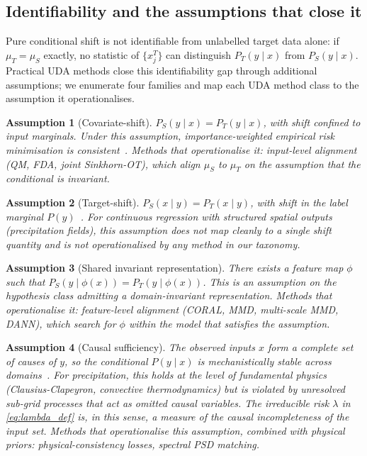 \documentclass{article}
\newtheorem{assumption}{Assumption}
\begin{document}
\subsection{Identifiability and the assumptions that close it}
\label{sec:identifiability}

Pure conditional shift is not identifiable from unlabelled target data
alone: if $\mu_T = \mu_S$ exactly, no statistic of $\{x_j^T\}$ can
distinguish $P_T(y\mid x)$ from $P_S(y\mid x)$. Practical UDA methods
close this identifiability gap through additional assumptions; we
enumerate four families and map each UDA method class to the
assumption it operationalises.

\begin{assumption}[Covariate-shift]
\label{ass:cov}
$P_S(y\mid x) = P_T(y\mid x)$, with shift confined to input marginals.
Under this assumption, importance-weighted empirical risk minimisation
is consistent~\citep{sugiyama2007direct}. Methods that operationalise
it: input-level alignment (QM, FDA, joint Sinkhorn-OT), which align
$\mu_S$ to $\mu_T$ on the assumption that the conditional is invariant.
\end{assumption}

\begin{assumption}[Target-shift]
\label{ass:tgt}
$P_S(x\mid y) = P_T(x\mid y)$, with shift in the label marginal
$P(y)$~\citep{lipton2018detecting}. For continuous regression with
structured spatial outputs (precipitation fields), this assumption
does not map cleanly to a single shift quantity and is not
operationalised by any method in our taxonomy.
\end{assumption}

\begin{assumption}[Shared invariant representation]
\label{ass:inv}
There exists a feature map $\phi$ such that $P_S(y\mid \phi(x))
= P_T(y\mid \phi(x))$. This is an assumption on the hypothesis class
admitting a domain-invariant representation. Methods that operationalise
it: feature-level alignment (CORAL, MMD, multi-scale MMD, DANN), which
search for $\phi$ within the model that satisfies the assumption.
\end{assumption}

\begin{assumption}[Causal sufficiency]
\label{ass:causal}
The observed inputs $x$ form a complete set of causes of $y$, so the
conditional $P(y\mid x)$ is mechanistically stable across
domains~\citep{scholkopf2012causal}. For precipitation, this holds at
the level of fundamental physics (Clausius-Clapeyron, convective
thermodynamics) but is violated by unresolved sub-grid processes that
act as omitted causal variables. The irreducible risk $\lambda$ in
\eqref{eq:lambda_def} is, in this sense, a measure of the causal
incompleteness of the input set. Methods that operationalise this
assumption, combined with physical priors: physical-consistency
losses, spectral PSD matching.
\end{assumption}
\end{document}
